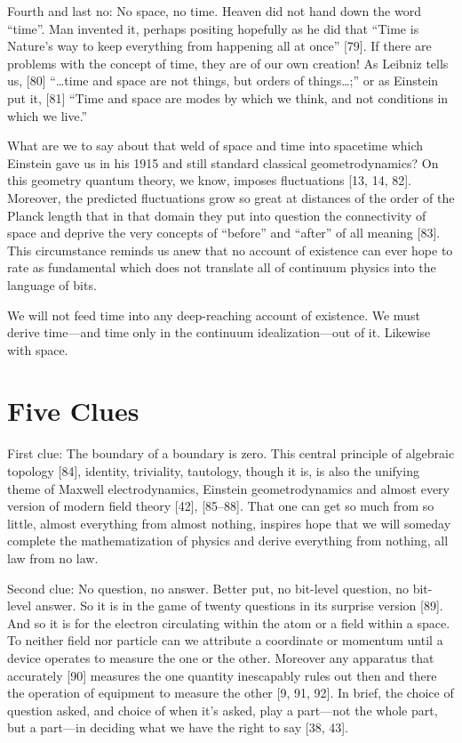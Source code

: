 \documentclass[11pt]{article}
\begin{document}
	Fourth and last no: No space, no time. Heaven did not hand down the word
	``time''. Man invented it, perhaps positing hopefully as he did that ``Time is Nature's
	way to keep everything from happening all at once'' [79]. If there are problems with
	the concept of time, they are of our own creation! As Leibniz tells us, [80] ``\ldots time
	and space are not things, but orders of things\ldots ;'' or as Einstein put it, [81] ``Time
	and space are modes by which we think, and not conditions in which we live.''
	
	What are we to say about that weld of space and time into spacetime which
	Einstein gave us in his 1915 and still standard classical geometrodynamics? On this
	geometry quantum theory, we know, imposes fluctuations [13, 14, 82]. Moreover, the
	predicted fluctuations grow so great at distances of the order of the Planck length
	that in that domain they put into question the connectivity of space and deprive
	the very concepts of ``before'' and ``after'' of all meaning [83]. This circumstance
	reminds us anew that no account of existence can ever hope to rate as fundamental
	which does not translate all of continuum physics into the language of bits.
	
	We will not feed time into any deep-reaching account of existence. We must
	derive time---and time only in the continuum idealization---out of it. Likewise
	with space.
	
	\section{Five Clues}
	First clue: The boundary of a boundary is zero. This central principle of algebraic
	topology [84], identity, triviality, tautology, though it is, is also the unifying theme
	of Maxwell electrodynamics, Einstein geometrodynamics and almost every version
	of modern field theory [42], [85--88]. That one can get so much from so little, almost
	everything from almost nothing, inspires hope that we will someday complete the
	mathematization of physics and derive everything from nothing, all law from no
	law.
	
	Second clue: No question, no answer. Better put, no bit-level question, no bit-level answer. So it is in the game of twenty questions in its surprise version [89].
	And so it is for the electron circulating within the atom or a field within a space.
	To neither field nor particle can we attribute a coordinate or momentum until a
	device operates to measure the one or the other. Moreover any apparatus that
	accurately [90] measures the one quantity inescapably rules out then and there the
	operation of equipment to measure the other [9, 91, 92]. In brief, the choice of
	question asked, and choice of when it's asked, play a part---not the whole part,
	but a part---in deciding what we have the right to say [38, 43].
	
\end{document}
